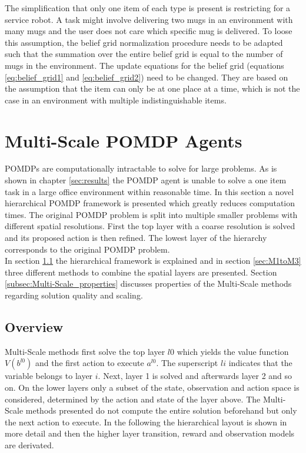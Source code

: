 The simplification that only one item of each type is present is restricting for a service robot. A task might involve delivering two mugs in an environment with many mugs and the user does not care which specific mug is delivered. To loose this assumption, the belief grid normalization procedure needs to be adapted such that the summation over the entire belief grid is equal to the number of mugs in the environment. The update equations for the belief grid (equations \ref{eq:belief_grid1} and \ref{eq:belief_grid2}) need to be changed. They are based on the assumption that the item can only be at one place at a time, which is not the case in an environment with multiple indistinguishable items.
 
\section{Multi-Scale POMDP Agents}\label{sec:Multi-Scale}
POMDPs are computationally intractable to solve for large problems. As is shown in chapter \ref{sec:results} the POMDP agent is unable to solve a one item task in a large office environment within reasonable time. In this section a novel hierarchical POMDP framework is presented which greatly reduces computation times. The original POMDP problem is split into multiple smaller problems with different spatial resolutions. First the top layer with a coarse resolution is solved and its proposed action is then refined. The lowest layer of the hierarchy corresponds to the original POMDP problem.\\
In section \ref{subsec:Multi-Scale_overview} the hierarchical framework is explained and in section \ref{sec:M1toM3} three different methods to combine the spatial layers are presented. Section \ref{subsec:Multi-Scale_properties} discusses properties of the Multi-Scale methods regarding solution quality and scaling. 

\subsection{Overview} \label{subsec:Multi-Scale_overview}
Multi-Scale methods first solve the top layer $l0$ which yields the value function $V(b^{l0})$ and the first action to execute $a^{l0}$. The superscript $li$ indicates that the variable belongs to layer $i$. Next, layer 1 is solved and afterwards layer 2 and so on. On the lower layers only a subset of the state, observation and action space is considered, determined by the action and state of the layer above. The Multi-Scale methods presented do not compute the entire solution beforehand but only the next action to execute. In the following the hierarchical layout is shown in more detail and then the higher layer transition, reward and observation models are derivated.

